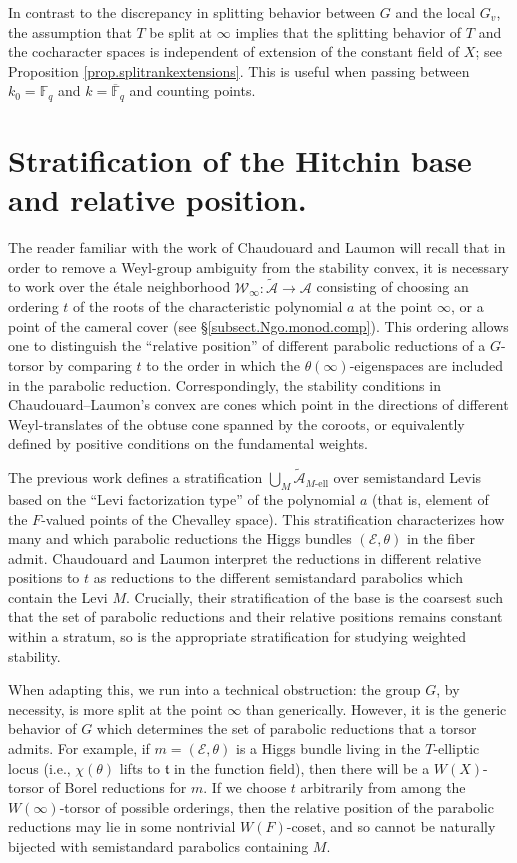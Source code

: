 \documentclass[openany]{amsbook}
\theoremstyle{definition}
\theoremstyle{remark}
\numberwithin{equation}{section}
\newcommand{\F}{\mathbb{F}}
\newcommand{\cA}{\mathcal{A}}
\newcommand{\cE}{\mathcal{E}}
\newcommand{\ol}[1]{\overline{#1}}
\renewcommand{\-}{\operatorname{-}}
\newcommand{\el}{\text{-ell}}
\newcommand{\ctA}{\widetilde{\cA}}
\newcommand{\ft}{\mathfrak{t}}
\begin{document}
In contrast to the discrepancy in splitting behavior between $G$ and the local $G_v$, the assumption that $T$ be split at $\infty$ implies that the splitting behavior of $T$ and the cocharacter spaces is independent of extension of the constant field of $X$; see Proposition \ref{prop.splitrankextensions}. This is useful when passing between $k_0 = \F_q$ and $k = \ol{\F}_q$ and counting points.


\section{Stratification of the Hitchin base and relative position.}

The reader familiar with the work of Chaudouard and Laumon will recall that in order to remove a Weyl-group ambiguity from the stability convex, it is necessary to work over the \'etale neighborhood $\mathcal{W}_\infty : \ctA \to \cA$ consisting of choosing an ordering $t$ of the roots of the characteristic polynomial $a$ at the point $\infty$, or a point of the cameral cover (see \S \ref{subsect.Ngo.monod.comp}). This ordering allows one to distinguish the ``relative position'' of different parabolic reductions of a $G$-torsor by comparing $t$ to the order in which the $\theta(\infty)$-eigenspaces are included in the parabolic reduction. Correspondingly, the stability conditions in Chaudouard--Laumon's convex are cones which point in the directions of different Weyl-translates of the obtuse cone spanned by the coroots, or equivalently defined by positive conditions on the fundamental weights.

The previous work defines a stratification $\bigcup_M \ctA_{M\el}$ over semistandard Levis based on the ``Levi factorization type'' of the polynomial $a$ (that is, element of the $F$-valued points of the Chevalley space). This stratification characterizes how many and which parabolic reductions the Higgs bundles $(\cE, \theta)$ in the fiber admit. Chaudouard and Laumon interpret the reductions in different relative positions to $t$ as reductions to the different semistandard parabolics which contain the Levi $M$. Crucially, their stratification of the base is the coarsest such that the set of parabolic reductions and their relative positions remains constant within a stratum, so is the appropriate stratification for studying weighted stability.

When adapting this, we run into a technical obstruction: the group $G$, by necessity, is more split at the point $\infty$ than generically. However, it is the generic behavior of $G$ which determines the set of parabolic reductions that a torsor admits. For example, if $m = (\cE, \theta)$ is a Higgs bundle living in the $T$-elliptic locus (i.e., $\chi(\theta)$ lifts to $\ft$ in the function field), then there will be a $W(X)$-torsor of Borel reductions for $m$. If we choose $t$ arbitrarily from among the $W(\infty)$-torsor of possible orderings, then the relative position of the parabolic reductions may lie in some nontrivial $W(F)$-coset, and so cannot be naturally bijected with semistandard parabolics containing $M$. 
\end{document}
